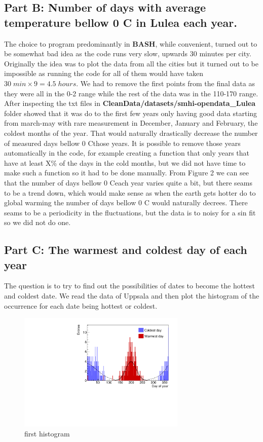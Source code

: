 \documentclass[a4paper]{article}
\begin{document}
\subsection{Part B: Number of days with average temperature bellow 0 C \degree in Lulea each
year.}
The choice to program predominantly in \textbf{BASH}, while convenient, turned out to be somewhat bad idea as the code runs very slow, upwards 30 minutes per city. Originally the idea was to plot the data from all the cities but it turned out to be impossible as running the code for all of them would have taken $30\; min \times 9=4.5\; hours$.
\newline
\newline
We had to remove the first points from the final data as they were all in the 0-2 range while the rest of the data was in the 110-170 range. After inspecting the txt files in \textbf{CleanData/datasets/smhi-opendata\_Lulea} folder showed that it was do to the first few years only having good data starting from march-may with rare measurement in December, January and February, the coldest months of the year. That would naturally drastically decrease the number of measured days bellow 0 C\degree those years. It is possible to remove those years automatically in the code, for example creating a function that only years that have at least X\% of the days in the cold months, but we did not have time to make such a function so it had to be done manually.
\newline
\newline{}
From Figure 2 we can see that the number of days bellow 0 C\degree each year varies quite a bit, but there seams to be a trend down, which would make sense as when the earth gets hotter do to global warming the number of days bellow 0 C \degree would naturally decrees. There seams to be a periodicity in the fluctuations, but the data is to noisy for a sin fit so we did not do one.
\subsection{Part C: The warmest and coldest day of each year}

The question is to try to find out the possibilities of dates to become the hottest and coldest date. We read the data of Uppsala and then plot the histogram of the occurrence for each date being hottest or coldest. 

\begin{figure}[htp]
    \centering
    \includegraphics[width=8cm]{./images/hotCold_Upp_prev}
    \caption{first histogram}
    \label{fig:hist}
\end{figure}
\end{document}
